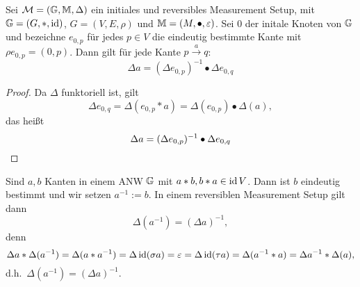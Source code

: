 \newcommand*{\Init}[1][p]{\ensuremath{e_{0, {#1}}}}
\begin{proposition}
    \label{prop:DarstDeltaInitialerKnoten}
    Sei $\mathcal{M} = (\mathbb{G}, \mathbb{M}, \Delta)$ ein initiales und reversibles Measurement Setup,
    mit $\mathbb{G} = (G, *, \operatorname{id})$, $G = (V, E, \rho)$ und $\mathbb{M} = (M, \bullet, \varepsilon)$.
    Sei $0$ der initale Knoten von $\mathbb{G}$ und bezeichne $\Init$ für jedes $p\in V$ die eindeutig bestimmte Kante mit $\rho \Init = (0, p)$.
    Dann gilt für jede Kante $p\xrightarrow{a} q$:
    \[
        \Delta a = (\Delta \Init[p])^{-1}\bullet \Delta \Init[q]
    \]
    
    \begin{proof}
        Da $\Delta$ funktoriell ist, gilt
        \[
            \Delta\Init[q]
                = \Delta(\Init[p]*a)
                = \Delta(\Init[p])\bullet\Delta(a),
        \]
        das heißt
        \[
            \Delta a = (\Delta\Init[p])^{-1} \bullet \Delta\Init[q]
                \qedhere
        \]
    \end{proof}
\end{proposition}

Sind $a, b$ Kanten in einem ANW $\mathbb{G}$ mit $a*b, b*a\in \operatorname{id} V$.
Dann ist $b$ eindeutig bestimmt und wir setzen $a^{-1} := b$.
In einem reversiblen Measurement Setup gilt dann
\[
    \Delta\left(a^{-1}\right) = (\Delta a)^{-1},
\]
denn
\[
    \Delta a*\Delta(a^{-1})
        = \Delta(a*a^{-1})
        = \Delta\operatorname{id}(\sigma a)
        = \varepsilon
        = \Delta\operatorname{id}(\tau a)
        = \Delta(a^{-1}*a)
        = \Delta a^{-1}*\Delta(a),
\]
d.h.~$\Delta(a^{-1}) = (\Delta a)^{-1}$.

